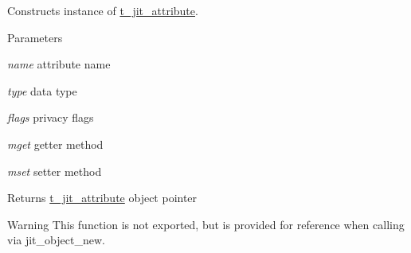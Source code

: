 Constructs instance of \hyperlink{structt__jit__attribute}{t\_\-jit\_\-attribute}. 
\begin{DoxyParams}{Parameters}
\item[{\em name}]attribute name \item[{\em type}]data type \item[{\em flags}]privacy flags \item[{\em mget}]getter method \item[{\em mset}]setter method\end{DoxyParams}
\begin{DoxyReturn}{Returns}
\hyperlink{structt__jit__attribute}{t\_\-jit\_\-attribute} object pointer
\end{DoxyReturn}
\begin{DoxyWarning}{Warning}
This function is not exported, but is provided for reference when calling via jit\_\-object\_\-new. 
\end{DoxyWarning}
